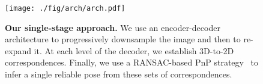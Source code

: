 
\begin{figure}[t]
\centering
\texttt{[image: ./fig/arch/arch.pdf]}
\vspace{-3mm}
    \caption{{\bf Our single-stage approach.} We use an encoder-decoder architecture to progressively downsample the image and then to re-expand it. At each level of the decoder, we establish 3D-to-2D correspondences. Finally, we use a RANSAC-based PnP strategy~\cite{Lepetit09} 
     to infer a single reliable pose from these sets of correspondences. 
    }
\label{fig:arch}
\end{figure}
